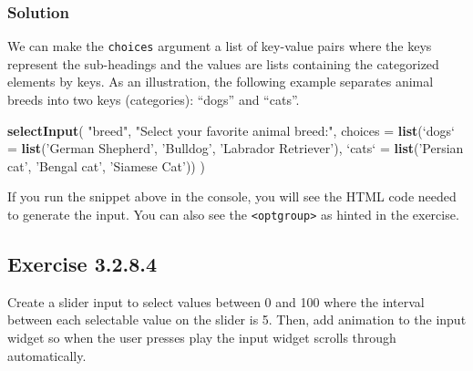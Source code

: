 \documentclass[]{book}
\newenvironment{Shaded}{\begin{snugshade}}{\end{snugshade}}
\newcommand{\DataTypeTok}[1]{\textcolor[rgb]{0.13,0.29,0.53}{#1}}
\newcommand{\KeywordTok}[1]{\textcolor[rgb]{0.13,0.29,0.53}{\textbf{#1}}}
\newcommand{\NormalTok}[1]{#1}
\newcommand{\StringTok}[1]{\textcolor[rgb]{0.31,0.60,0.02}{#1}}
\begin{document}
\begin{solution}

\hypertarget{solution-2}{%
\subsubsection*{Solution}\label{solution-2}}

We can make the \texttt{choices} argument a list of key-value pairs where the keys
represent the sub-headings and the values are lists containing the categorized
elements by keys. As an illustration, the following example separates animal breeds into two keys (categories): ``dogs'' and ``cats''.

\begin{Shaded}
\begin{Highlighting}[]
\KeywordTok{selectInput}\NormalTok{(}
  \StringTok{"breed"}\NormalTok{,}
  \StringTok{"Select your favorite animal breed:"}\NormalTok{,}
  \DataTypeTok{choices =}
    \KeywordTok{list}\NormalTok{(}\StringTok{`}\DataTypeTok{dogs}\StringTok{`}\NormalTok{ =}\StringTok{ }\KeywordTok{list}\NormalTok{(}\StringTok{'German Shepherd'}\NormalTok{, }\StringTok{'Bulldog'}\NormalTok{, }\StringTok{'Labrador Retriever'}\NormalTok{),}
         \StringTok{`}\DataTypeTok{cats}\StringTok{`}\NormalTok{ =}\StringTok{ }\KeywordTok{list}\NormalTok{(}\StringTok{'Persian cat'}\NormalTok{, }\StringTok{'Bengal cat'}\NormalTok{, }\StringTok{'Siamese Cat'}\NormalTok{))}
\NormalTok{)}
\end{Highlighting}
\end{Shaded}

If you run the snippet above in the console, you will see the HTML code needed
to generate the input. You can also see the \texttt{\textless{}optgroup\textgreater{}} as hinted in the
exercise.

\end{solution}

\hypertarget{exercise-3.2.8.4}{%
\subsection*{Exercise 3.2.8.4}\label{exercise-3.2.8.4}}

Create a slider input to select values between 0 and 100 where the interval
between each selectable value on the slider is 5. Then, add animation to the
input widget so when the user presses play the input widget scrolls through
automatically.
\end{document}
